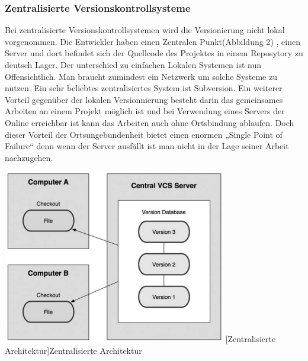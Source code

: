 \documentclass[12pt,a4paper,bibliography=totocnumbered,listof=totocnumbered]{scrartcl}
\begin{document}
\subsubsection{Zentralisierte Versionskontrollsysteme}
Bei zentralisierte Versionskontrollsystemen wird die Versionierung nicht lokal vorgenommen. Die Entwickler haben einen Zentralen Punkt(Abbildung 2) , einen Server und dort befindet sich der Quellcode des Projektes in einem Reposytory zu deutsch Lager. Der unterschied zu einfachen Lokalen Systemen ist nun Offensichtlich. Man braucht zumindest ein Netzwerk um solche Systeme zu nutzen. Ein sehr beliebtes zentralisiertes System ist Subversion. Ein weiterer Vorteil gegenüber der lokalen Versionnierung besteht darin das gemeinsames Arbeiten an einem Projekt möglich ist und bei Verwendung eines Servers der Online erreichbar ist kann das Arbeiten auch ohne Ortsbindung ablaufen. Doch dieser Vorteil der Ortsungebundenheit bietet einen enormen „Single Point of Failure“ denn wenn der Server ausfällt ist man nicht in der Lage seiner Arbeit nachzugehen.

\newline
\vspace{3pt}
\begin{minipage}{\linewidth}
	\centering
	\includegraphics[width=0.3\linewidth]{Bilder/sub.png}
	[Zentralisierte Architektur]{Zentralisierte Architektur\footnotemark }
	\label{fig:osgi}
\end{minipage} 	
\end{document}
